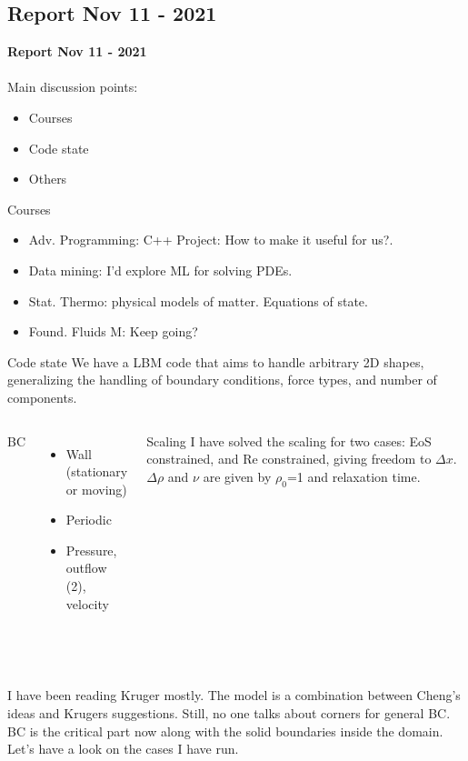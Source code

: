 \documentclass{beamer}
\begin{document}
	\subsection{Report Nov 11 - 2021}
	\justifying
	\begin{frame}
		\textbf{Report Nov 11 - 2021}\\~\\
		Main discussion points:
		\begin{itemize}
			\item Courses
			\item Code state
			\item Others
		\end{itemize}
	\end{frame}
	\begin{frame}{Courses}
		\begin{itemize}
			\item Adv. Programming: \alert{C++ Project: How to make it useful for us?}.
			\item Data mining: \alert{I'd explore ML for solving PDEs}.
			\item Stat. Thermo: physical models of matter. Equations of state.
			\item Found. Fluids M: Keep going?
		\end{itemize}
	\end{frame}

	\begin{frame}{Code state}
		We have a LBM code that aims to handle arbitrary 2D shapes, generalizing the handling of boundary conditions, force types, and number of components. 
		\begin{columns}
			BC
			\begin{itemize}
				\item Wall (stationary or moving)
				\item Periodic
				\item \alert{Pressure, outflow (2), velocity}
			\end{itemize}
			
			Scaling
			I have solved the scaling for two cases: EoS constrained, and Re constrained, giving freedom to $\Delta x$. $\Delta \rho$ and $\nu$ are given by $\rho_0$=1 and relaxation time.
		\end{columns}
		~\\~\\
		I have been reading Kruger mostly. The model is a combination between Cheng's ideas and Krugers suggestions. Still, no one talks about corners for general BC. BC is the critical part now along with the solid boundaries \alert{inside} the domain.\\
		Let's have a look on the cases I have run.
	\end{frame}
\end{document}
